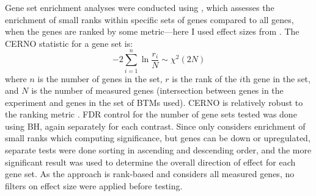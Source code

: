 Gene set enrichment analyses were conducted using  \autocite{weiner3rd2016TmodPackageGeneral}, 
which assesses the enrichment of small ranks within specific sets of genes compared to all genes, when the genes are ranked by some metric---here I used effect sizes from .
%
%
The CERNO statistic for a gene set is:
\begin{equation}
    -2 \sum_{i=1}^{n} \ln \frac{r_i}{N} \sim \chi^2(2N)
\end{equation}
where $n$ is the number of genes in the set,
$r$ is the rank of the $i$th gene in the set,
and $N$ is the number of measured genes (intersection between genes in the experiment and genes in the set of \glspl{BTM} used).
CERNO is relatively robust to the ranking metric \autocite{zyla2019GeneSetEnrichment}.
\gls{FDR} control for the number of gene sets tested was done using \gls{BH}, again separately for each contrast.
Since  only considers enrichment of small ranks which computing significance, 
but genes can be down or upregulated, 
separate tests were done sorting in ascending and descending order,
and the more significant result was used to determine the overall direction of effect for each gene set.
As the approach is rank-based and considers all measured genes, no filters on effect size were applied before testing.

